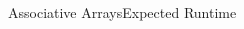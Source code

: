 \begin{frame}{Associative Arrays}{Expected Runtime}
\begin{columns}
\begin{column}{0.5\linewidth}
\begin{center}
      \end{center}
    \end{column}
  \end{columns}
\end{frame}



